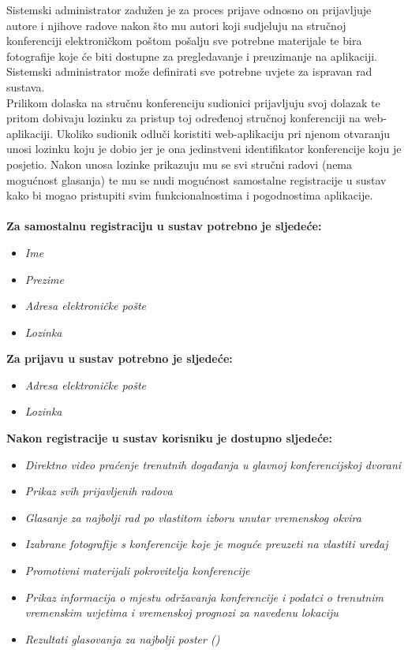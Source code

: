 		Sistemski administrator zadužen je za proces prijave odnosno on prijavljuje autore i njihove radove nakon što mu autori koji sudjeluju na stručnoj konferenciji elektroničkom poštom pošalju sve potrebne materijale te bira fotografije koje će biti dostupne za pregledavanje i preuzimanje na aplikaciji. Sistemski administrator može definirati sve potrebne uvjete za ispravan rad sustava.\\
		
		Prilikom dolaska na stručnu konferenciju sudionici prijavljuju svoj dolazak te pritom dobivaju lozinku za pristup toj određenoj stručnoj konferenciji na web-aplikaciji. Ukoliko sudionik odluči koristiti web-aplikaciju pri njenom otvaranju unosi lozinku koju je dobio jer je ona jedinstveni identifikator konferencije koju je posjetio. Nakon unosa lozinke prikazuju mu se svi stručni radovi (nema mogućnost glasanja) te mu se nudi mogućnost samostalne registracije u sustav kako bi mogao pristupiti svim funkcionalnostima i pogodnostima aplikacije.\\\\

        \textbf{Za samostalnu registraciju u sustav potrebno je sljedeće:}
        \begin{itemize}
        	\item \textit{Ime}
        	\item \textit{Prezime}
        	\item \textit{Adresa elektroničke pošte}
        	\item \textit{Lozinka}
        \end{itemize}

		\textbf{Za prijavu u sustav potrebno je sljedeće:}
        \begin{itemize}
            \item \textit{Adresa elektroničke pošte}
            \item \textit{Lozinka}
        \end{itemize}
        
        \textbf{Nakon registracije u sustav korisniku je dostupno sljedeće:}
        \begin{itemize}
        	\item \textit{Direktno video praćenje trenutnih događanja u glavnoj konferencijskoj dvorani}
        	\item \textit{Prikaz svih prijavljenih radova}
        	\item \textit{Glasanje za najbolji rad po vlastitom izboru unutar vremenskog okvira}
        	\item \textit{Izabrane fotografije s konferencije koje je moguće preuzeti na vlastiti uređaj}
        	\item \textit{Promotivni materijali pokrovitelja konferencije}
        	\item \textit{Prikaz informacija o mjestu održavanja konferencije i podatci o trenutnim vremenskim uvjetima i vremenskoj prognozi za navedenu lokaciju}
        	\item \textit{Rezultati glasovanja za najbolji poster ()}
        \end{itemize}

